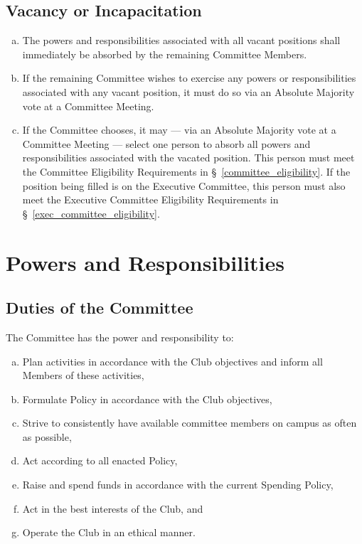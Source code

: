 \documentclass[a4paper,12pt]{article}
\begin{document}
\subsection{Vacancy or Incapacitation}

\begin{enumerate}[a)]
	\item The powers and responsibilities associated with all vacant positions shall immediately be absorbed by the remaining Committee Members.
	\item If the remaining Committee wishes to exercise any powers or responsibilities associated with any vacant position, it must do so via an Absolute Majority vote at a Committee Meeting.
	\item If the Committee chooses, it may --- via an Absolute Majority vote at a Committee Meeting --- select one person to absorb all powers and responsibilities associated with the vacated position. This person must meet the Committee Eligibility Requirements in \S~\ref{committee_eligibility}. If the position being filled is on the Executive Committee, this person must also meet the Executive Committee Eligibility Requirements in \S~\ref{exec_committee_eligibility}.
\end{enumerate}

\section{Powers and Responsibilities}

\subsection{Duties of the Committee}

The Committee has the power and responsibility to:

\begin{enumerate}[a)]
	\item Plan activities in accordance with the Club objectives and inform all Members of these activities,
	\item Formulate Policy in accordance with the Club objectives,
	\item Strive to consistently have available committee members on campus as often as possible,
	\item Act according to all enacted Policy,
	\item Raise and spend funds in accordance with the current Spending Policy,
	\item Act in the best interests of the Club, and
	\item Operate the Club in an ethical manner.
\end{enumerate}
\end{document}
